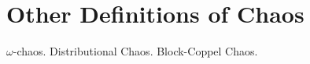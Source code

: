 \documentclass[12pt,twoside,draft]{book}
\begin{document}
\chapter{Other Definitions of Chaos}
$\omega$-chaos.
Distributional Chaos.
Block-Coppel Chaos.




\printindex
\end{document}
